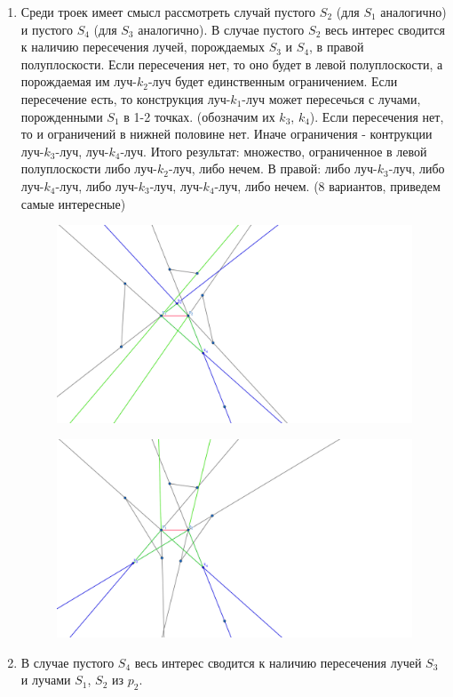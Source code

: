 \documentclass[letterpaper,12pt]{article}
\begin{document}
\begin{enumerate}
\begin{figure}[H]
            \end{figure}
      \item Среди троек имеет смысл рассмотреть случай пустого
            $S_2$ (для $S_1$ аналогично) и пустого $S_4$ 
            (для $S_3$ аналогично).
            В случае пустого $S_2$ весь интерес сводится к наличию
            пересечения лучей, порождаемых $S_3$ и $S_4$, в правой 
            полуплоскости. Если пересечения нет, то оно будет в
            левой полуплоскости, а порождаемая им луч-$k_2$-луч будет
            единственным ограничением.
            Если пересечение есть, то конструкция 
            луч-$k_1$-луч может пересечься с лучами, порожденными
            $S_1$ в 1-2 точках. (обозначим их $k_3$, $k_4$).
            Если пересечения нет, то и ограничений в нижней половине
            нет. Иначе ограничения - контрукции луч-$k_3$-луч,
            луч-$k_4$-луч. Итого результат: множество, 
            ограниченное в левой полуплоскости либо
            луч-$k_2$-луч, либо нечем. В правой: либо луч-$k_3$-луч,
            либо луч-$k_4$-луч, либо луч-$k_3$-луч, луч-$k_4$-луч, 
            либо нечем. (8 вариантов, приведем самые интересные)
            \begin{figure}[H]
                  \centering
                  \includegraphics[width=0.5\linewidth]{nozone_3_1.png}
            \end{figure}
            \begin{figure}[H]
                  \centering
                  \includegraphics[width=0.5\linewidth]{nozone_3_2.png}
            \end{figure}
      \item В случае пустого $S_4$ весь интерес сводится к наличию
            пересечения лучей $S_3$ и лучами $S_1$, $S_2$ из $p_2$.

\end{enumerate}
\end{document}
